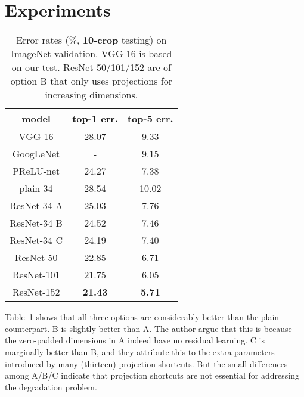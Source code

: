 \documentclass[10pt,twocolumn,letterpaper]{article}
\begin{document}
\section{Experiments}
\begin{table}[htbp]
\small
\renewcommand\arraystretch{1.2}
\centering
\begin{tabular}{|c|c|c|}
\hline
model & top-1 err.& top-5 err. \\
\hline
VGG-16 & 28.07 & 9.33 \\
GoogLeNet \cite{Szegedy2014Going} & - & 9.15 \\
PReLU-net & 24.27 & 7.38 \\
\hline
\hline
plain-34 & 28.54 & 10.02 \\
ResNet-34 A & 25.03 & 7.76 \\
ResNet-34 B & 24.52 & 7.46 \\
ResNet-34 C & 24.19 & 7.40 \\
\hline
ResNet-50 & 22.85 & 6.71 \\
ResNet-101 & 21.75 & 6.05 \\
ResNet-152 & \textbf{21.43} & \textbf{5.71} \\
\hline
\end{tabular} 
\caption{Error rates (\%, \textbf{10-crop} testing) on ImageNet validation. VGG-16 is based on our test. ResNet-50/101/152 are of option B that only uses projections for increasing dimensions.} \label{tab1}
\end{table}
Table~\ref{tab1} shows that all three options are considerably better than the plain counterpart. B is slightly better than A. The author argue that this is because the zero-padded dimensions in A indeed have no residual learning. C is marginally better than B, and they attribute this to the extra parameters introduced by many (thirteen) projection shortcuts. But the small differences among A/B/C indicate that projection shortcuts are not essential for addressing the degradation problem. 
{\small


}
\end{document}
